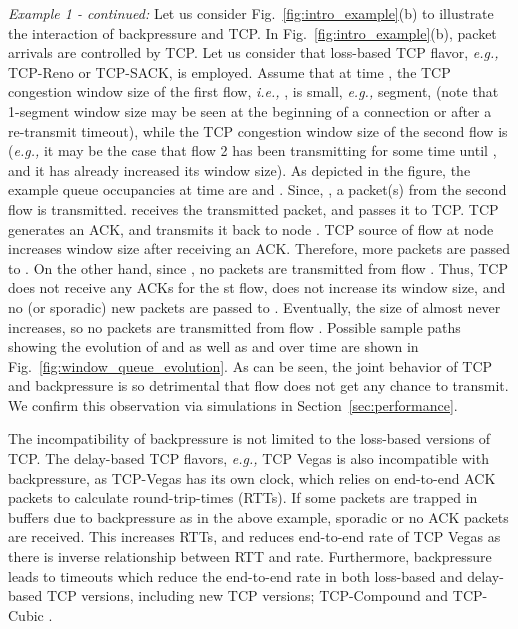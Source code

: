 \documentclass[conference]{IEEEtran}
\newcommand{\ie}{{\em i.e., }}
\newcommand{\eg}{{\em e.g., }}
\begin{document}
{\em Example 1 - continued:} Let us consider Fig.~\ref{fig:intro_example}(b) to illustrate the interaction of backpressure and TCP. In Fig.~\ref{fig:intro_example}(b), packet arrivals are controlled by TCP. Let us consider that loss-based TCP flavor, \eg TCP-Reno or TCP-SACK, is employed. Assume that at time , the TCP congestion window size of the first flow, \ie , is small, \eg  segment, (note that 1-segment window size may be seen at the beginning of a connection or after a re-transmit timeout), while the TCP congestion window size of the second flow is  (\eg it may be the case that flow 2 has been transmitting for some time until , and it has already increased its window size). As depicted in the figure, the example queue occupancies at time  are  and . Since, , a packet(s) from the second flow is transmitted.  receives the transmitted packet, and passes it to TCP. TCP generates an ACK, and transmits it back to node . TCP source of flow  at node  increases window size after receiving an ACK. Therefore, more packets are passed to . On the other hand, since , no packets are transmitted from flow . Thus, TCP does not receive any ACKs for the st flow, does not increase its window size, and no (or sporadic) new packets are passed to . Eventually, the size of  almost never increases, so no packets are transmitted from flow . Possible sample paths showing the evolution of  and  as well as  and  over time are shown in Fig.~\ref{fig:window_queue_evolution}. As can be seen, the joint behavior of TCP and backpressure is so detrimental that flow  does not get any chance to transmit. We confirm this observation via simulations in Section~\ref{sec:performance}.\hfill 


The incompatibility of backpressure is not limited to the loss-based versions of TCP. The delay-based TCP flavors, \eg TCP Vegas is also incompatible with backpressure, as TCP-Vegas has its own clock, which relies on end-to-end ACK packets to calculate round-trip-times (RTTs). If some packets are trapped in buffers due to backpressure as in the above example, sporadic or no ACK packets are received. This increases RTTs, and reduces end-to-end rate of TCP Vegas as there is inverse relationship between RTT and rate. Furthermore, backpressure leads to timeouts which reduce the end-to-end rate in both loss-based and delay-based TCP versions, including new TCP versions; TCP-Compound \cite{tcp_compound} and TCP-Cubic \cite{tcp_cubic}.
\end{document}
